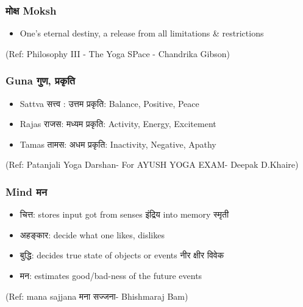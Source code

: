 \begin{frame}[fragile]\frametitle{ मोक्ष Moksh}

	\begin{itemize}
	\item One's eternal destiny, a release from all limitations \& restrictions
	\end{itemize}

\tiny{(Ref: Philosophy III - The Yoga SPace - Chandrika Gibson)}

\end{frame}

\begin{frame}[fragile]\frametitle{Guna गुण, प्रकृति}

	\begin{itemize}
	\item Sattva सत्त्व : उत्तम प्रकृति: Balance, Positive, Peace
	\item Rajas राजस: मध्यम प्रकृति: Activity, Energy, Excitement
	\item Tamas तामस: अधम प्रकृति: Inactivity, Negative, Apathy

	\end{itemize}

  
  \tiny{(Ref: Patanjali Yoga Darshan- For AYUSH YOGA EXAM- Deepak D.Khaire)}

\end{frame}

\begin{frame}[fragile]\frametitle{Mind मन}

	\begin{itemize}
	\item चित्त: stores input got from senses इंद्रिय into memory स्मृती
	\item अहङ्कार: decide what one likes, dislikes
	\item बुद्धि: decides true state of objects or events नीर क्षीर विवेक 
	\item मन: estimates good/bad-ness of the future events
	\end{itemize}

  
  \tiny{(Ref: mana sajjana मना सज्जना- Bhishmaraj Bam)}

\end{frame}